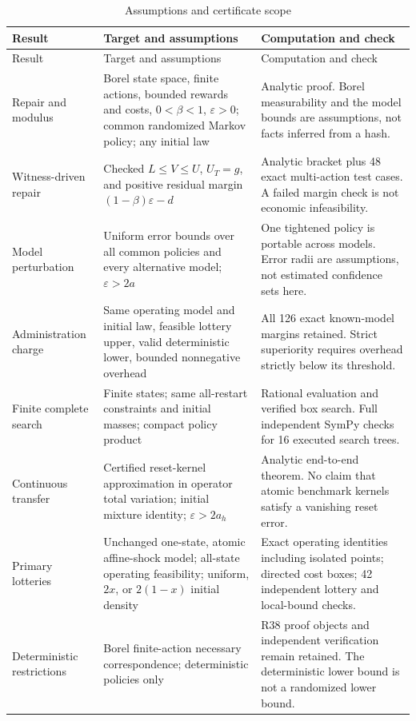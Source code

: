 \begin{longtable}{p{}p{}p{}}
\caption{Assumptions and certificate scope}\label{tab:assumptions}\\
\toprule Result & Target and assumptions & Computation and check \\ \midrule\endfirsthead
\toprule Result & Target and assumptions & Computation and check \\ \midrule\endhead
Repair and modulus & Borel state space, finite actions, bounded rewards and costs, $0<\beta<1$, $\varepsilon>0$; common randomized Markov policy; any initial law & Analytic proof. Borel measurability and the model bounds are assumptions, not facts inferred from a hash. \\
Witness-driven repair & Checked $L\leq V\leq U$, $U_T=g$, and positive residual margin $(1-\beta)\varepsilon-d$ & Analytic bracket plus 48 exact multi-action test cases. A failed margin check is not economic infeasibility. \\Model perturbation & Uniform error bounds over all common policies and every alternative model; $\varepsilon>2a$ & One tightened policy is portable across models. Error radii are assumptions, not estimated confidence sets here. \\Administration charge & Same operating model and initial law, feasible lottery upper, valid deterministic lower, bounded nonnegative overhead & All 126 exact known-model margins retained. Strict superiority requires overhead strictly below its threshold. \\Finite complete search & Finite states; same all-restart constraints and initial masses; compact policy product & Rational evaluation and verified box search. Full independent SymPy checks for 16 executed search trees. \\
Continuous transfer & Certified reset-kernel approximation in operator total variation; initial mixture identity; $\varepsilon>2a_h$ & Analytic end-to-end theorem. No claim that atomic benchmark kernels satisfy a vanishing reset error. \\
Primary lotteries & Unchanged one-state, atomic affine-shock model; all-state operating feasibility; uniform, $2x$, or $2(1-x)$ initial density & Exact operating identities including isolated points; directed cost boxes; 42 independent lottery and local-bound checks. \\
Deterministic restrictions & Borel finite-action necessary correspondence; deterministic policies only & R38 proof objects and independent verification remain retained. The deterministic lower bound is not a randomized lower bound. \\

\end{longtable}
